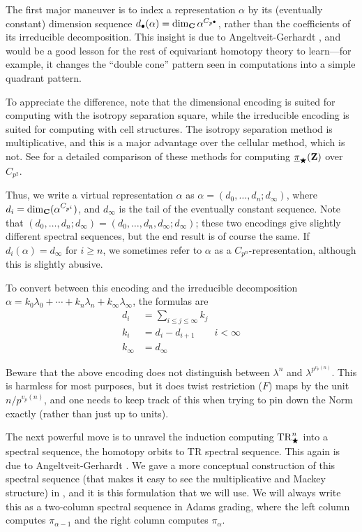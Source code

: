 \begin{notation}
  The first major maneuver is to index a representation $\alpha$ by its (eventually constant) dimension sequence $d_\bullet(\alpha)=\dim_\mathbf C \alpha^{C_{p^\bullet}}$, rather than the coefficients of its irreducible decomposition. This insight is due to Angeltveit-Gerhardt \cite{ROS1TR}, and would be a good lesson for the rest of equivariant homotopy theory to learn---for example, it changes the ``double cone'' pattern seen in computations into a simple quadrant pattern.

    To appreciate the difference, note that the dimensional encoding is suited for computing with the isotropy separation square, while the irreducible encoding is suited for computing with cell structures. The isotropy separation method is multiplicative, and this is a major advantage over the cellular method, which is not. See \cite{Zengv1} for a detailed comparison of these methods for computing $\underline\pi_\bigstar(\mathbf Z)$ over $C_{p^2}$.

    Thus, we write a virtual representation $\alpha$ as $\alpha=(d_0,\dotsc,d_n;d_\infty)$, where $d_i = \dim_\mathbf C(\alpha^{C_{p^i}})$, and $d_\infty$ is the tail of the eventually constant sequence. Note that $(d_0,\dotsc,d_n;d_\infty) = (d_0,\dotsc,d_n,d_\infty;d_\infty)$; these two encodings give slightly different spectral sequences, but the end result is of course the same. If $d_i(\alpha)=d_\infty$ for $i\ge n$, we sometimes refer to $\alpha$ as a $C_{p^n}$-representation, although this is slightly abusive.

  To convert between this encoding and the irreducible decomposition $\alpha=k_0\lambda_0 + \dotsb + k_n \lambda_n + k_\infty \lambda_\infty$, the formulas are
  \begin{align*}
    d_i &= \sum_{i\le j\le \infty} k_j\\
    k_i &= d_i - d_{i+1} \qquad i <\infty\\
    k_\infty &= d_\infty
  \end{align*}

  Beware that the above encoding does not distinguish between $\lambda^n$ and $\lambda^{p^{v_p(n)}}$. This is harmless for most purposes, but it does twist restriction ($F$) maps by the unit $n/p^{v_p(n)}$, and one needs to keep track of this when trying to pin down the Norm exactly (rather than just up to units).
\end{notation}

\begin{notation}[HOTRSS]
  The next powerful move is to unravel the induction computing $\mathrm{TR}^n_\bigstar$ into a spectral sequence, the homotopy orbits to TR spectral sequence. This again is due to Angeltveit-Gerhardt \cite[]{ROS1TR}. We gave a more conceptual construction of this spectral sequence (that makes it easy to see the multiplicative and Mackey structure) in \cite[]{SulROGTHH}, and it is this formulation that we will use. We will always write this as a two-column spectral sequence in Adams grading, where the left column computes $\pi_{\alpha-1}$ and the right column computes $\pi_\alpha$.
\end{notation}


